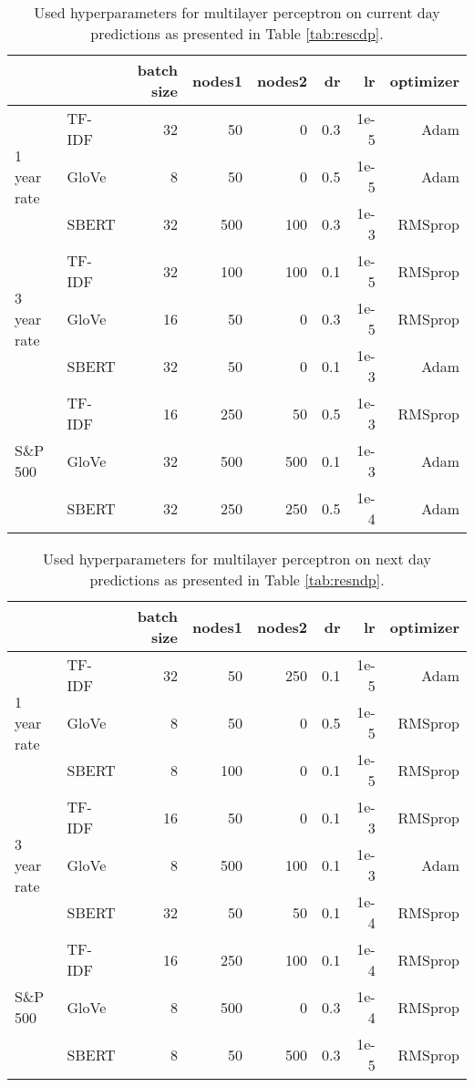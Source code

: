 \begin{table}[t]
\begin{tabular}{llrrrrrr}
      & & \textbf{batch size} & \textbf{nodes1} & \textbf{nodes2} & \textbf{dr} & \textbf{lr} & \textbf{optimizer} \\
      \hline \hline 
     \multirow{3}{*}{1 year rate} & TF-IDF & 32 & 50 & 0 & 0.3 & 1e-5 & Adam \\
     & GloVe & 8 & 50 & 0 & 0.5 & 1e-5 & Adam \\
     & SBERT & 32 & 500 & 100 & 0.3 & 1e-3 & RMSprop \\
     \hline 
     \multirow{3}{*}{3 year rate} & TF-IDF & 32 & 100 & 100 & 0.1 & 1e-5 & RMSprop \\
     & GloVe & 16 & 50 & 0 & 0.3 & 1e-5 & RMSprop \\
     & SBERT & 32 & 50 & 0 & 0.1 & 1e-3 & Adam \\
     \hline 
     \multirow{3}{*}{S\&P 500} & TF-IDF & 16 & 250 & 50 & 0.5 & 1e-3 & RMSprop \\
     & GloVe & 32 & 500 & 500 & 0.1 & 1e-3 & Adam \\
     & SBERT & 32 & 250 & 250 & 0.5 & 1e-4 & Adam  \\
     \hline 
\end{tabular}
\caption{Used hyperparameters for multilayer perceptron on current day predictions as presented in Table \ref{tab:rescdp}.}
\end{table}

\begin{table}[t]
\begin{tabular}{llrrrrrr}
      & & \textbf{batch size} & \textbf{nodes1} & \textbf{nodes2} & \textbf{dr} & \textbf{lr} & \textbf{optimizer} \\
      \hline \hline 
     \multirow{3}{*}{1 year rate} & TF-IDF & 32 & 50 & 250 & 0.1 &  1e-5 & Adam \\
     & GloVe & 8 & 50 & 0 & 0.5 & 1e-5 & RMSprop\\
     & SBERT & 8 & 100 & 0 & 0.1 & 1e-5 & RMSprop \\
     \hline 
     \multirow{3}{*}{3 year rate} & TF-IDF & 16 & 50 & 0 & 0.1 & 1e-3 & RMSprop  \\
     & GloVe & 8 & 500 & 100 & 0.1 & 1e-3 & Adam \\
     & SBERT & 32 & 50 & 50 & 0.1 & 1e-4 & RMSprop \\
     \hline 
     \multirow{3}{*}{S\&P 500} & TF-IDF & 16 & 250 & 100 & 0.1 & 1e-4 & RMSprop \\
     & GloVe & 8 & 500 & 0 & 0.3 & 1e-4 & RMSprop \\
     & SBERT & 8 & 50 & 500 & 0.3 & 1e-5 & RMSprop \\
     \hline 
\end{tabular}
\caption{Used hyperparameters for multilayer perceptron on next day predictions as presented in Table \ref{tab:resndp}.}
\end{table}